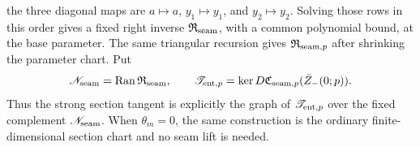 \begin{lemma}
the three diagonal maps are \(a\mapsto a\), \(y_1\mapsto y_1\), and
\(y_2\mapsto y_2\).  Solving those rows in this order gives a fixed
right inverse \(\mathfrak R_{\rm seam}\), with a common polynomial bound,
at the base parameter.  The same triangular recursion gives
\(\mathfrak R_{{\rm seam},p}\) after shrinking the parameter chart.  Put
\begin{equation}
 \mathscr N_{\rm seam}
 =\operatorname{Ran}\mathfrak R_{\rm seam},\qquad
 \mathscr T_{{\rm ent},p}
 =\ker D\mathfrak C_{{\rm seam},p}(\bar Z_-(0;p)).
                                                               \label{eq:anchor-entry-explicit-complement}
\end{equation}
Thus the strong section tangent is explicitly the graph of
\(\mathscr T_{{\rm ent},p}\) over the fixed complement
\(\mathscr N_{\rm seam}\).  When \(\theta_m=0\), the same construction is
the ordinary finite-dimensional section chart and no seam lift is needed.


\end{lemma}
